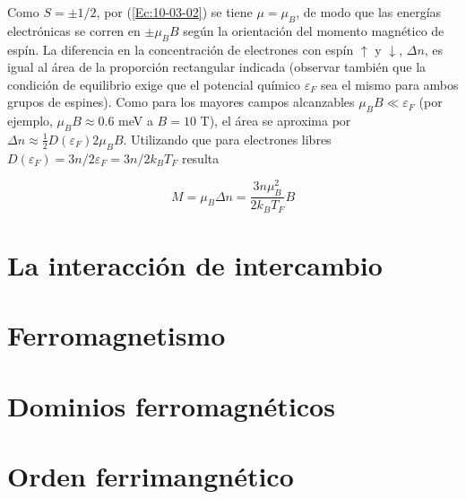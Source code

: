 Como $S=\pm 1/2$, por (\ref{Ec:10-03-02}) se tiene $\mu=\mu_B$, de modo que las energías electrónicas se corren en $\pm \mu_B B$ según la orientación del momento magnético de espín. La diferencia en la concentración de electrones con espín $\uparrow$ y $\downarrow$, $\Delta n$, es igual al área de la proporción rectangular indicada (observar también que la condición de equilibrio exige que el potencial químico $\varepsilon_F$ sea el mismo para ambos grupos de espines). Como para los mayores campos alcanzables $\mu_B B \ll \varepsilon_F$ (por ejemplo, $\mu_B B \approx 0.6 $ meV a $B=10$ T), el área se aproxima por $\Delta n \approx \frac{1}{2} D (\varepsilon_F) 2 \mu_B B$. Utilizando que para electrones libres $D(\varepsilon_F) = 3n/2\varepsilon_F = 3n/2k_B T_F$ resulta 

\begin{equation}
	M= \mu_B \Delta n = \frac{3n\mu_B^2}{2k_B T_F} B
\end{equation}


\section{La interacción de intercambio}

\section{Ferromagnetismo}

\section{Dominios ferromagnéticos}

\section{Orden ferrimangnético}

